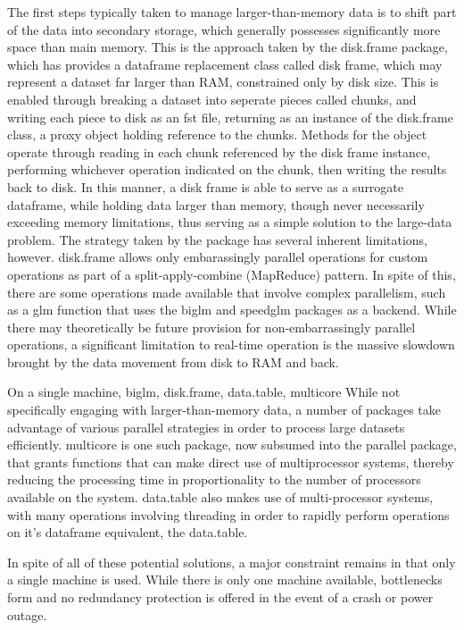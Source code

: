 \documentclass[a4paper,10pt]{article}
\begin{document}
The first steps typically taken to manage larger-than-memory data is to shift
part of the data into secondary storage, which generally possesses
significantly more space than main memory.
This is the approach taken by the disk.frame package, which has provides a dataframe replacement class called disk frame, which may represent a dataset far larger than RAM, constrained only by disk size\cite{zj20}.
This is enabled through breaking a dataset into seperate pieces called chunks, and writing each piece to disk as an fst file, returning as an instance of the disk.frame class, a proxy object holding reference to the chunks.
Methods for the object operate through reading in each chunk referenced by the disk frame instance, performing whichever operation indicated on the chunk, then writing the results back to disk. In this manner, a disk frame is able to serve as a surrogate dataframe, while holding data larger than memory, though never necessarily exceeding memory limitations, thus serving as a simple solution to the large-data problem.
The strategy taken by the package has several inherent limitations, however.
disk.frame allows only embarassingly parallel operations for custom operations as part of a split-apply-combine (MapReduce) pattern. In spite of this, there are some operations made available that involve complex parallelism, such as a glm function that uses the biglm and speedglm packages as a backend.
While there may theoretically be future provision for non-embarrassingly parallel operations, a significant limitation to real-time operation is the massive slowdown brought by the data movement from disk to RAM and back.

On a single machine, biglm, disk.frame, data.table, multicore
While not specifically engaging with larger-than-memory data, a number of packages take advantage of various parallel strategies in order to process large datasets efficiently.
multicore is one such package, now subsumed into the parallel package, that grants functions that can make direct use of multiprocessor systems, thereby reducing the processing time in proportionality to the number of processors available on the system.
data.table also makes use of multi-processor systems, with many operations involving threading in order to rapidly perform operations on it's dataframe equivalent, the data.table.

In spite of all of these potential solutions, a major constraint remains in that only a single machine is used.
While there is only one machine available, bottlenecks form and no redundancy protection is offered in the event of a crash or power outage.
\end{document}
